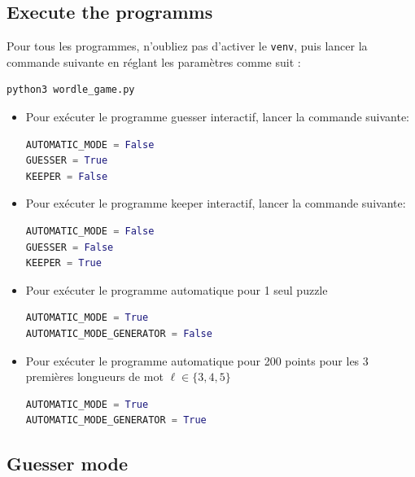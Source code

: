 \documentclass[10pt,a4paper,hidelinks]{article}
\begin{document}
\subsection*{Execute the programms}
\label{section:notice_wordle}
Pour tous les programmes, n'oubliez pas d'activer le \verb|venv|, puis lancer la commande suivante en réglant les paramètres comme suit :
\begin{lstlisting}[language=Python]
python3 wordle_game.py
\end{lstlisting}
\begin{itemize}
    \item Pour exécuter le programme guesser interactif, lancer la commande suivante:
\begin{lstlisting}[language=Python]
AUTOMATIC_MODE = False
GUESSER = True
KEEPER = False
\end{lstlisting}
    \item Pour exécuter le programme keeper interactif, lancer la commande suivante:
\begin{lstlisting}[language=Python]
AUTOMATIC_MODE = False
GUESSER = False
KEEPER = True
\end{lstlisting}
    \item Pour exécuter le programme automatique pour 1 seul puzzle
\begin{lstlisting}[language=Python]
AUTOMATIC_MODE = True
AUTOMATIC_MODE_GENERATOR = False
\end{lstlisting}
    \item Pour exécuter le programme automatique pour 200 points pour les 3 premières longueurs de mot $\ell\in\{3, 4, 5\}$
\begin{lstlisting}[language=Python]
AUTOMATIC_MODE = True
AUTOMATIC_MODE_GENERATOR = True
\end{lstlisting}
\end{itemize}

\subsection{Guesser mode}
\end{document}
